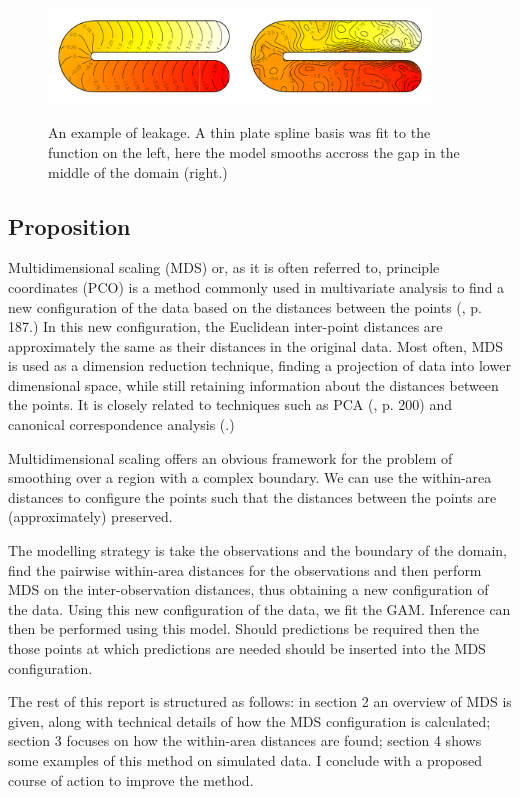 \documentclass[a4paper,10pt]{article}
\begin{document}
\begin{figure}
\centering
\includegraphics[width=4in]{figs/ramsay-leak.pdf}\\
\caption{An example of leakage. A thin plate spline basis was fit to the function on the left, here the model smooths accross the gap in the middle of the domain (right.)}
\label{leakage}
\end{figure}


\subsection{Proposition}

Multidimensional scaling (MDS) or, as it is often referred to, principle coordinates (PCO) is a method commonly used in multivariate analysis to find a new configuration of the data based on the distances between the points (\cite{chatfieldcollins}, p. 187.) In this new configuration, the Euclidean inter-point distances are approximately the same as their distances in the original data. Most often, MDS is used as a dimension reduction technique, finding a projection of data into lower dimensional space, while still retaining information about the distances between the points. It is closely related to techniques such as PCA (\cite{chatfieldcollins}, p. 200) and canonical correspondence analysis (\cite{terbraak}.)

Multidimensional scaling offers an obvious framework for the problem of smoothing over a region with a complex boundary. We can use the within-area distances to configure the points such that the distances between the points are (approximately) preserved.

The modelling strategy is take the observations and the boundary of the domain, find the pairwise within-area distances for the observations and then perform MDS on the inter-observation distances, thus obtaining a new configuration of the data. Using this new configuration of the data, we fit the GAM. Inference can then be performed using this model. Should predictions be required then the those points at which predictions are needed should be inserted into the MDS configuration.

The rest of this report is structured as follows: in section 2 an overview of MDS is given, along with technical details of how the MDS configuration is calculated; section 3 focuses on how the within-area distances are found; section 4 shows some examples of this method on simulated data. I conclude with a proposed course of action to improve the method.
\end{document}
